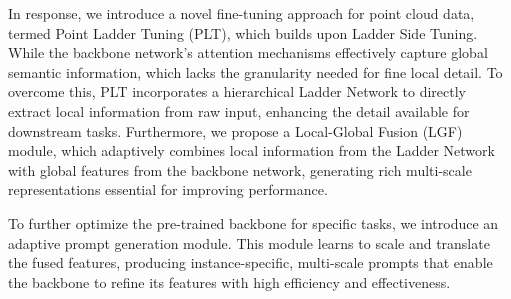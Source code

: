 
In response, we introduce a novel fine-tuning approach for point cloud data, termed Point Ladder Tuning (PLT), which builds upon Ladder Side Tuning. While the backbone network’s attention mechanisms effectively capture global semantic information, which lacks the granularity needed for fine local detail. To overcome this, PLT incorporates a hierarchical Ladder Network to directly extract local information from raw input, enhancing the detail available for downstream tasks. Furthermore, we propose a Local-Global Fusion (LGF) module, which adaptively combines local information from the Ladder Network with global features from the backbone network, generating rich multi-scale representations essential for improving performance.

To further optimize the pre-trained backbone for specific tasks, we introduce an adaptive prompt generation module. This module learns to scale and translate the fused features, producing instance-specific, multi-scale prompts that enable the backbone to refine its features with high efficiency and effectiveness.

% 


